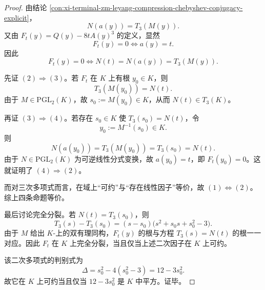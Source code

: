 \begin{proof}
由结论 \ref{con:xi-terminal-zm-leyang-compression-chebyshev-conjugacy-explicit}，
\[
N(a(y))=T_3(M(y)).
\]
又由 \(F_t(y)=Q(y)-8tA(y)^3\) 的定义，显然
\[
F_t(y)=0
\iff
a(y)=t.
\]
因此
\[
F_t(y)=0
\iff
N(t)=N(a(y))=T_3(M(y)).
\]

先证 \((2)\Rightarrow(3)\)。若 \(F_t\) 在 \(K\) 上有根 \(y_0\in K\)，则
\[
T_3(M(y_0))=N(t).
\]
由于 \(M\in \mathrm{PGL}_2(K)\)，故 \(s_0:=M(y_0)\in K\)，从而 \(N(t)\in T_3(K)\)。

再证 \((3)\Rightarrow(4)\)。若存在 \(s_0\in K\) 使 \(T_3(s_0)=N(t)\)，令
\[
y_0:=M^{-1}(s_0)\in K.
\]
则
\[
N(a(y_0))=T_3(M(y_0))=T_3(s_0)=N(t).
\]
由于 \(N\in \mathrm{PGL}_2(K)\) 为可逆线性分式变换，故 \(a(y_0)=t\)，即 \(F_t(y_0)=0\)。这就证明了 \((4)\Rightarrow(2)\)。

而对三次多项式而言，在域上“可约”与“存在线性因子”等价，故 \((1)\Leftrightarrow(2)\)。综上四条命题等价。

最后讨论完全分裂。若 \(N(t)=T_3(s_0)\)，则
\[
T_3(s)-T_3(s_0)
=(s-s_0)\bigl(s^2+s_0s+s_0^2-3\bigr).
\]
由于 \(M\) 给出 \(K\)-上的双有理同构，\(F_t(y)\) 的根与方程 \(T_3(s)=N(t)\) 的根一一对应。因此 \(F_t\) 在 \(K\) 上完全分裂，当且仅当上述二次因子在 \(K\) 上可约。

该二次多项式的判别式为
\[
\Delta=s_0^2-4(s_0^2-3)=12-3s_0^2.
\]
故它在 \(K\) 上可约当且仅当 \(12-3s_0^2\) 是 \(K\) 中平方。证毕。
\end{proof}

\endinput
